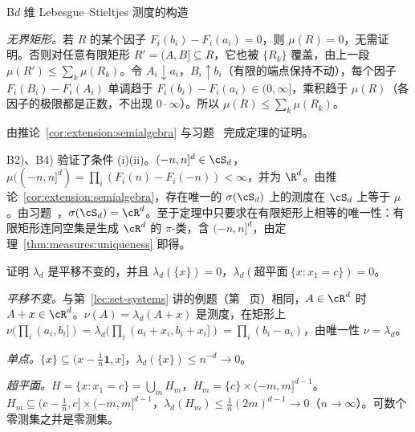 \begin{probleme}{B}{$d$ 维 Lebesgue--Stieltjes 测度的构造}
\begin{questions}
\begin{solution}
\emph{无界矩形。}若 $R$ 的某个因子 $F_i(b_i)-F_i(a_i)=0$，则 $\mu(R)=0$，无需证明。否则对任意有限矩形 $R'=(A,B]\subseteq R$，它也被 $\{R_k\}$ 覆盖，由上一段 $\mu(R')\leqslant\sum_k\mu(R_k)$。令 $A_i\downarrow a_i$，$B_i\uparrow b_i$（有限的端点保持不动），每个因子 $F_i(B_i)-F_i(A_i)$ 单调趋于 $F_i(b_i)-F_i(a_i)\in(0,\infty]$，乘积趋于 $\mu(R)$（各因子的极限都是正数，不出现 $0\cdot\infty$）。所以 $\mu(R)\leqslant\sum_k\mu(R_k)$。
\end{solution}
\item 由推论~\ref{cor:extension:semialgebra} 与习题~ 完成定理的证明。
\begin{solution}
B2)、B4) 验证了条件 (i)(ii)。$(-n,n]^d\in\cS_d$，$\mu((-n,n]^d)=\prod_i(F_i(n)-F_i(-n))<\infty$，并为 $\R^d$。由推论~\ref{cor:extension:semialgebra}，存在唯一的 $\sigma(\cS_d)$ 上的测度在 $\cS_d$ 上等于 $\mu$。由习题~，$\sigma(\cS_d)=\cR^d$。至于定理中只要求在有限矩形上相等的唯一性：有限矩形连同空集是生成 $\cR^d$ 的 $\pi$-类，含 $(-n,n]^d$，由定理~\ref{thm:measures:uniqueness} 即得。
\end{solution}
\item 证明 $\lambda_d$ 是平移不变的，并且 $\lambda_d(\{x\})=0$，$\lambda_d(\text{超平面}\ \{x: x_1=c\})=0$。
\begin{solution}
\emph{平移不变。}与第~\ref{lec:set-systems} 讲的例题（第~\pageref{we:set-systems:translation} 页）相同，$A\in\cR^d$ 时 $A+x\in\cR^d$。$\nu(A)=\lambda_d(A+x)$ 是测度，在矩形上 $\nu(\prod_i(a_i,b_i])=\lambda_d(\prod_i(a_i+x_i,b_i+x_i])=\prod_i(b_i-a_i)$，由唯一性 $\nu=\lambda_d$。

\emph{单点。}$\{x\}\subseteq(x-\frac1n\mathbf 1,x]$，$\lambda_d(\{x\})\leqslant n^{-d}\to0$。

\emph{超平面。}$H=\{x:x_1=c\}=\bigcup_m H_m$，$H_m=\{c\}\times(-m,m]^{d-1}$。$H_m\subseteq(c-\frac1n,c]\times(-m,m]^{d-1}$，$\lambda_d(H_m)\leqslant\frac1n(2m)^{d-1}\to0$（$n\to\infty$）。可数个零测集之并是零测集。
\end{solution}
\end{questions}
\end{probleme}

